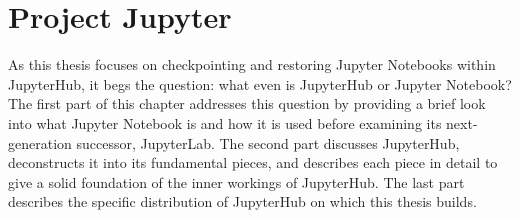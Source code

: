 \documentclass[
  digital,     %
  oneside,     %
  nosansbold,  %
  nocolorbold, %
  lof,         %
  nolot,         %
]{fithesis4}
\begin{document}









\chapter{Project Jupyter}
As this thesis focuses on checkpointing and restoring Jupyter Notebooks within JupyterHub, it begs the question: what even is JupyterHub or Jupyter Notebook? The first part of this chapter addresses this question by providing a brief look into what Jupyter Notebook is and how it is used before examining its next-generation successor, JupyterLab. The second part discusses JupyterHub, deconstructs it into its fundamental pieces, and describes each piece in detail to give a solid foundation of the inner workings of JupyterHub. The last part describes the specific distribution of JupyterHub on which this thesis builds.
\end{document}
